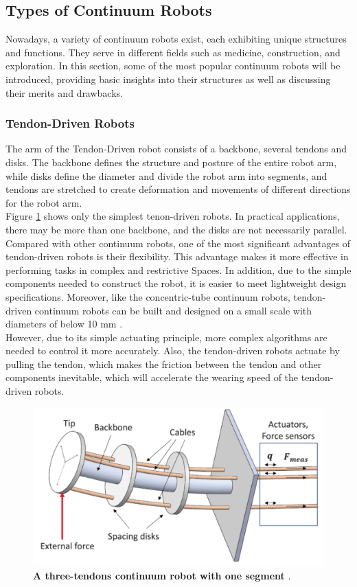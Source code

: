 \subsection{Types of Continuum Robots}
Nowadays, a variety of continuum robots exist, each exhibiting unique structures and functions. They serve in different fields 
such as medicine, construction, and exploration. In this section, some of the most popular continuum robots will be introduced, 
providing basic insights into their structures as well as discussing their merits and drawbacks. \\
\vspace{-10mm}
\subsubsection{Tendon-Driven Robots}
The arm of the Tendon-Driven robot consists of a backbone, several tendons and disks. The backbone defines the structure and 
posture of the entire robot arm, while disks define the diameter and divide the robot arm into segments, and tendons are 
stretched to create deformation and movements of different directions for the robot arm. \\
Figure \ref{fig:3tendon_1segment_CR} shows only the simplest tenon-driven robots. In practical applications, there 
may be more than one backbone, and the disks are not necessarily parallel. \\
Compared with other continuum robots, one of the most significant advantages of tendon-driven robots is their flexibility. 
This advantage makes it more effective in performing tasks in complex and restrictive Spaces. In addition, due to the simple 
components needed to construct the robot, it is easier to meet lightweight design specifications. Moreover, like the 
concentric-tube continuum robots, tendon-driven continuum robots can be built and designed on a small scale with diameters of 
below 10 mm \cite{amanov2021tendon}. \\
However, due to its simple actuating principle, more complex algorithms are needed to control it more accurately. Also, the 
tendon-driven robots actuate by pulling the tendon, which makes the friction between the tendon and other components inevitable, 
which will accelerate the wearing speed of the tendon-driven robots.
\begin{figure}[H] %
    \centering
    \captionsetup{labelsep=colon}
    \includegraphics[width=.7\textwidth]{Image/LR/3tendon_1segment_CR.PNG} 
    \caption[A three-tendons continuum robot with one segment]
    {\centering \textbf{A three-tendons continuum robot with one segment} \cite{3tendon_1segment_CR}.}
    \label{fig:3tendon_1segment_CR}
\end{figure}
